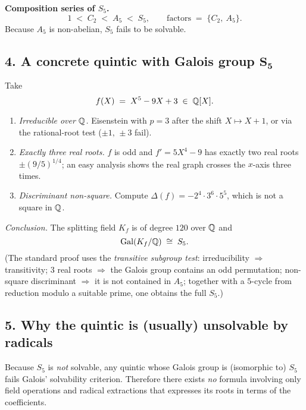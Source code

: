 \documentclass[12pt]{article}
\theoremstyle{definition} %
\theoremstyle{plain} %
\begin{document}
\medskip
\textbf{Composition series of \(S_5\).}
\[
   1 \;<\; C_2 \;<\; A_5 \;<\; S_5,
\qquad
\text{factors}\;=\;\{C_2,\ A_5\}.
\]
Because \(A_5\) is non-abelian, \(S_5\) fails to be solvable.

\subsection*{4.  A concrete quintic with Galois group \(\boldsymbol{S_5}\)}

Take
\[
   f(X)\;=\;X^{5}-9X+3\;\in\;\Bbb Q[X].
\]
\begin{enumerate}
   \item \emph{Irreducible over \(\Bbb Q\).}\;
         Eisenstein with \(p=3\) after the shift \(X\mapsto X+1\), or
         via the rational-root test ($\pm1,\,\pm3$ fail).
   \item \emph{Exactly three real roots.}\;
         \(f\) is odd and \(f' = 5X^{4}-9\) has exactly two real roots
         \(\pm(9/5)^{1/4}\); an easy analysis shows the real graph
         crosses the \(x\)-axis three times.
   \item \emph{Discriminant non-square.}\;
         Compute \(\Delta(f)=-2^{4}\cdot3^{6}\cdot5^{5}\), which is not
         a square in \(\Bbb Q\).
\end{enumerate}

\noindent
\emph{Conclusion.}\;
The splitting field \(K_f\) is of degree \(120\) over \(\Bbb Q\) and
\[
   \operatorname{Gal}(K_f/\Bbb Q)\;\cong\;S_5.
\]
(The standard proof uses the \emph{transitive subgroup test}:
irreducibility \(\Rightarrow\) transitivity;  
\(3\) real roots \(\Rightarrow\) the Galois group contains an odd
permutation;  
non-square discriminant \(\Rightarrow\) it is not contained in \(A_5\);  
together with a \(5\)-cycle from reduction modulo a suitable prime, one
obtains the full \(S_5\).)

\subsection*{5.  Why the quintic is (usually) unsolvable by radicals}

Because \(S_5\) is \emph{not} solvable, any quintic whose Galois group
is (isomorphic to) \(S_5\) fails Galois’ solvability criterion.
Therefore there exists \emph{no} formula involving only field
operations and radical extractions that expresses its roots in terms of
the coefficients.
\end{document}
